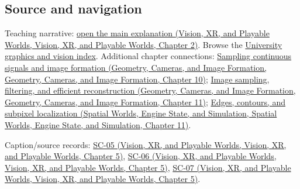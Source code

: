 \subsection{Source and navigation}\label{appendix-47c51ea026fb-source-and-navigation}

Teaching narrative: \href{../07-Vision-XR-and-Playable-Worlds/main.pdf\#nameddest=04-visual-computing-ii-ch031-convolutional-models-preserve-image-neighborhoods}{open the main explanation (Vision, XR, and Playable Worlds, Vision, XR, and Playable Worlds, Chapter 2)}. Browse the \hyperref[appendix-a6d556a4ef50-university-graphics-vision-and-photography---independent-series]{University graphics and vision index}. Additional chapter connections: \href{../03-Geometry-Cameras-and-Image-Formation/main.pdf\#nameddest=03-visual-computing-i-ch003-sampling-continuous-signals-and-image-formation}{Sampling continuous signals and image formation (Geometry, Cameras, and Image Formation, Geometry, Cameras, and Image Formation, Chapter 10)}; \href{../03-Geometry-Cameras-and-Image-Formation/main.pdf\#nameddest=03-visual-computing-i-ch004-image-sampling-filtering-and-efficient-reconstruction}{Image sampling, filtering, and efficient reconstruction (Geometry, Cameras, and Image Formation, Geometry, Cameras, and Image Formation, Chapter 11)}; \href{../05-Spatial-Worlds-Engine-State-and-Simulation/main.pdf\#nameddest=04-visual-computing-ii-ch030-edges-contours-and-subpixel-localization}{Edges, contours, and subpixel localization (Spatial Worlds, Engine State, and Simulation, Spatial Worlds, Engine State, and Simulation, Chapter 11)}.

Caption/source records: \href{../07-Vision-XR-and-Playable-Worlds/main.pdf\#nameddest=04-visual-computing-ii-ch036-sc-05---stanford-cs231n-spring-2025-lecture-5-image-classification-with-cnns}{SC-05 (Vision, XR, and Playable Worlds, Vision, XR, and Playable Worlds, Chapter 5)}, \href{../07-Vision-XR-and-Playable-Worlds/main.pdf\#nameddest=04-visual-computing-ii-ch036-sc-06---stanford-cs231n-deep-learning-for-computer-vision-spring-2025-lecture-6-cnn-architectures}{SC-06 (Vision, XR, and Playable Worlds, Vision, XR, and Playable Worlds, Chapter 5)}, \href{../07-Vision-XR-and-Playable-Worlds/main.pdf\#nameddest=04-visual-computing-ii-ch036-sc-07---stanford-cs231n-spring-2025-lecture-7-recurrent-neural-networks}{SC-07 (Vision, XR, and Playable Worlds, Vision, XR, and Playable Worlds, Chapter 5)}.
